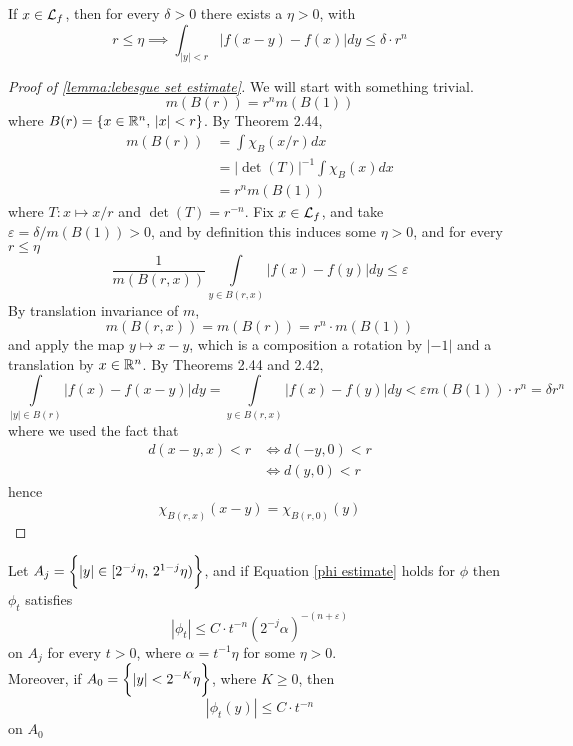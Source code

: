 \documentclass[../../main.tex]{subfiles}
\begin{document}
\begin{lemma}\label{lemma:lebesgue set estimate}
    If $x\in\mathcal{L}_f$, then for every $\delta>0$ there exists a $\eta>0$, with\[r\leq\eta\implies\int_{|y|<r}|f(x-y)-f(x)|dy\leq\delta\cdot r^n\]
\end{lemma}
\begin{proof}[Proof of \ref{lemma:lebesgue set estimate}]
    We will start with something trivial.\begin{equation}\label{ball rn multiple}
        m(B(r))=r^nm(B(1))
    \end{equation}
    where $B(r)=\{x\in{\mathbb{R}^n},\,|x|<r\}$. By Theorem 2.44,\begin{align*}
        m(B(r))&=\int\chi_B(x/r)dx\\
        &= |\det(T)|^{-1}\int \chi_B(x)dx\\
        &=r^nm(B(1))
    \end{align*}
    where $T:x\mapsto x/r$ and $\det(T)=r^{-n}$. Fix $x\in\mathcal{L}_f$, and take $\varepsilon=\delta/m(B(1))>0$, and by definition this induces some $\eta>0$, and for every $r\leq\eta$
    \[\dfrac{1}{m(B(r,x))}\int\limits_{y\in B(r,x)}|f(x)-f(y)|dy\leq\varepsilon\] 
    By translation invariance of $m$, \[m(B(r,x))=m(B(r))=r^n\cdot m(B(1))\]
    and apply the map $y\mapsto x-y$, which is a composition a rotation by $|-1|$ and a translation by $x\in{\mathbb{R}^n}$. By Theorems 2.44 and 2.42, \[\int\limits_{|y|\in B(r)}|f(x)-f(x-y)|dy=\int\limits_{y\in B(r,x)}|f(x)-f(y)|dy<\varepsilon m(B(1))\cdot r^n =\delta r^n\]
    where we used the fact that\begin{align*}d(x-y,x)<r&\iff d(-y,0)<r\\
    &\iff d(y,0)<r
    \end{align*}
    hence\[\chi_{B(r,x)}(x-y)=\chi_{B(r,0)}(y)\]
\end{proof}
\begin{lemma}\label{lemma:phi estimates}
    Let $A_j = \biggl\{{|y|\in[2^{-j}\eta,\,2^{1-j}\eta)}\biggr\}$, and if Equation \eqref{phi estimate} holds for $\phi$ then $\phi_t$ satisfies 
    \begin{equation}\label{phi estimate on Aj}
        |\phi_t|\leq C\cdot t^{-n}(2^{-j}\alpha)^{-(n+\varepsilon)}
    \end{equation}
    on $A_j$ for every $t>0$, where $\alpha=t^{-1}\eta$ for some $\eta>0$. \\
    
    Moreover, if $A_0 = \biggl\{{|y|<2^{-K}\eta}\biggr\}$, where $K\geq 0$, then \begin{equation}\label{phi estimate on A0}|\phi_t(y)|\leq C\cdot t^{-n}\end{equation} on $A_0$
\end{lemma}
\end{document}
